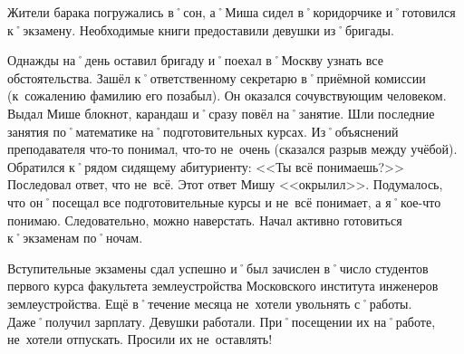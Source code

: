 Жители барака погружались в˚сон, а˚Миша сидел в˚коридорчике и˚готовился к˚экзамену. Необходимые книги предоставили девушки из˚бригады.

Однажды на˚день оставил бригаду и˚поехал в˚Москву узнать все обстоятельства. Зашёл к˚ответственному секретарю в˚приёмной комиссии (к~сожалению фамилию его позабыл). Он оказался сочувствующим человеком. Выдал Мише блокнот, карандаш и˚сразу повёл на˚занятие. Шли последние занятия по˚математике на˚подготовительных курсах. Из˚объяснений преподавателя что-то понимал, что-то не~очень (сказался разрыв между учёбой). Обратился к˚рядом сидящему абитуриенту: <<Ты всё понимаешь?>> Последовал ответ, что не~всё. Этот ответ Мишу <<окрылил>>. Подумалось, что он˚посещал все подготовительные курсы и не~всё понимает, а я˚кое-что понимаю. Следовательно, можно наверстать. Начал активно готовиться к˚экзаменам по˚ночам.

Вступительные экзамены сдал успешно и˚был зачислен в˚число студентов первого курса факультета землеустройства Московского института инженеров землеустройства. Ещё в˚течение месяца не~хотели увольнять с˚работы. Даже˚получил зарплату. Девушки работали. При˚посещении их на˚работе, не~хотели отпускать. Просили их не~оставлять!